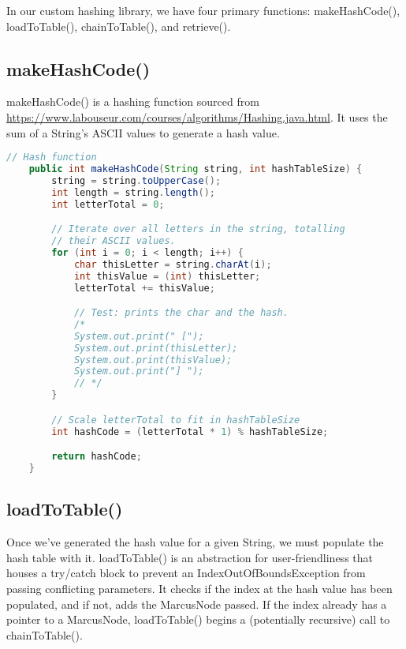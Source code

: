 \documentclass[letterpaper, 10pt]{article}
\begin{document}
\hspace{1.0em}In our custom hashing library, we have four primary functions: makeHashCode(), loadToTable(), chainToTable(), and retrieve().

\subsection{makeHashCode()}

\hspace{1.0em} makeHashCode() is a hashing function sourced from \url{https://www.labouseur.com/courses/algorithms/Hashing.java.html}. It uses the sum of a String's ASCII values to generate a hash value.

\begin{lstlisting}[language=Java, firstnumber=14]
    // Hash function
    public int makeHashCode(String string, int hashTableSize) {
        string = string.toUpperCase();
        int length = string.length();
        int letterTotal = 0;

        // Iterate over all letters in the string, totalling
        // their ASCII values.
        for (int i = 0; i < length; i++) {
            char thisLetter = string.charAt(i);
            int thisValue = (int) thisLetter;
            letterTotal += thisValue;

            // Test: prints the char and the hash.
            /*
            System.out.print(" [");
            System.out.print(thisLetter);
            System.out.print(thisValue);
            System.out.print("] ");
            // */
        }

        // Scale letterTotal to fit in hashTableSize
        int hashCode = (letterTotal * 1) % hashTableSize;

        return hashCode;
    }
\end{lstlisting}

\vspace{6.0em}

\subsection{loadToTable()}

\hspace{1.0em}Once we've generated the hash value for a given String, we must populate the hash table with it. loadToTable() is an abstraction for user-friendliness that houses a try/catch block to prevent an IndexOutOfBoundsException from passing conflicting parameters. It checks if the index at the hash value has been populated, and if not, adds the MarcusNode passed. If the index already has a pointer to a MarcusNode, loadToTable() begins a (potentially recursive) call to chainToTable().
\end{document}
